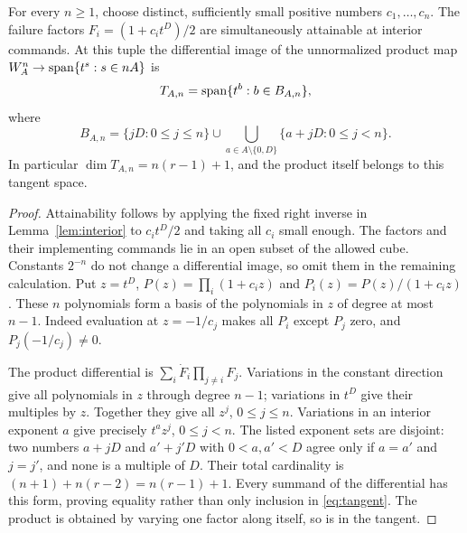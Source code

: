 \begin{lemma}\label{lem:binomial-tangent}
For every $n\ge1$, choose distinct, sufficiently small positive numbers
$c_1,\ldots,c_n$. The failure factors
$F_i=(1+c_it^D)/2$ are simultaneously attainable at interior commands.
At this tuple the differential image of the unnormalized product map
$W_A^n\to\operatorname{span}\{t^s:s\in nA\}$ is
\begin{equation}\label{eq:tangent}
 T_{A,n}=\operatorname{span}\{t^b:b\in B_{A,n}\},
\end{equation}
where
\begin{equation}\label{eq:tangent-support}
 B_{A,n}=\{jD:0\le j\le n\}
 \cup\!\!\bigcup_{a\in A\setminus\{0,D\}}
          \{a+jD:0\le j<n\}.
\end{equation}
In particular $\dim T_{A,n}=n(r-1)+1$, and the product itself belongs to
this tangent space.
\end{lemma}
\begin{proof}
Attainability follows by applying the fixed right inverse in
Lemma~\ref{lem:interior} to $c_it^D/2$ and taking all $c_i$ small enough.
The factors and their implementing commands lie in an open subset of
the allowed cube. Constants $2^{-n}$ do not change a differential image,
so omit them in the remaining calculation. Put $z=t^D$,
$P(z)=\prod_i(1+c_iz)$ and $P_i(z)=P(z)/(1+c_iz)$. These $n$
polynomials form a basis of the polynomials in $z$ of degree at most
$n-1$. Indeed evaluation at $z=-1/c_j$ makes all $P_i$ except $P_j$
zero, and $P_j(-1/c_j)\ne0$.

The product differential is $\sum_i\dot F_i\prod_{j\ne i}F_j$.
Variations in the constant direction give all polynomials in $z$ through
degree $n-1$; variations in $t^D$ give their multiples by $z$.
Together they give all $z^j$, $0\le j\le n$. Variations in an interior
exponent $a$ give precisely $t^a z^j$, $0\le j<n$. The listed exponent
sets are disjoint: two numbers $a+jD$ and $a'+j'D$ with
$0<a,a'<D$ agree only if $a=a'$ and $j=j'$, and none is a multiple of
$D$. Their total cardinality is $(n+1)+n(r-2)=n(r-1)+1$.
Every summand of the differential has this form, proving equality rather
than only inclusion in \eqref{eq:tangent}. The product is obtained by
varying one factor along itself, so is in the tangent.
\end{proof}


